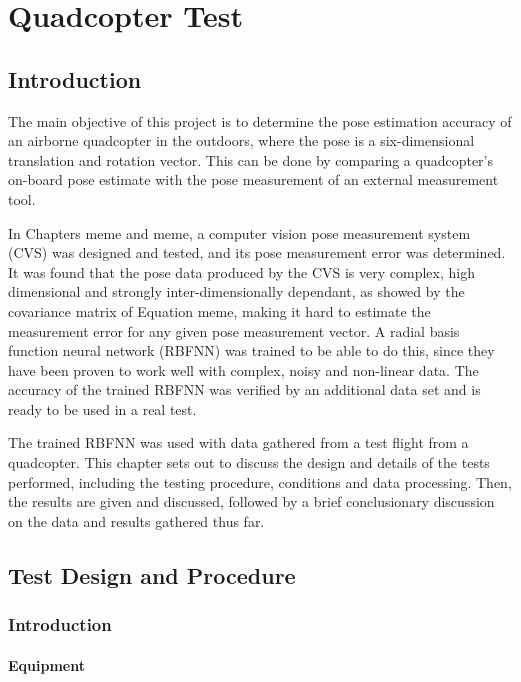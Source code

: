 \chapter{Quadcopter Test}

\section{Introduction}

The main objective of this project is to determine the pose estimation accuracy of an airborne quadcopter in the outdoors, where the pose is a six-dimensional translation and rotation vector. This can be done by comparing a quadcopter's on-board pose estimate with the pose measurement of an external measurement tool. 

In Chapters meme and meme, a computer vision pose measurement system (CVS) was designed and tested, and its pose measurement error was determined. It was found that the pose data produced by the CVS is very complex, high dimensional and strongly inter-dimensionally dependant, as showed by the covariance matrix of Equation meme, making it hard to estimate the measurement error for any given pose measurement vector. A radial basis function neural network (RBFNN) was trained to be able to do this, since they have been proven to work well with complex, noisy and non-linear data. The accuracy of the trained RBFNN was verified by an additional data set and is ready to be used in a real test. 

The trained RBFNN was used with data gathered from a test flight from a quadcopter. This chapter sets out to discuss the design and details of the tests performed, including the testing procedure, conditions and data processing. Then, the results are given and discussed, followed by a brief conclusionary discussion on the data and results gathered thus far. 

\section{Test Design and Procedure}

\subsection{Introduction}

\subsubsection{Equipment}

